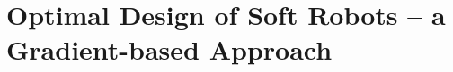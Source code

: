 \chapter[Design Optimization]{Optimal Design of Soft Robots -- a Gradient-based Approach}
\label{chap: chapter 2}


%

%

%
